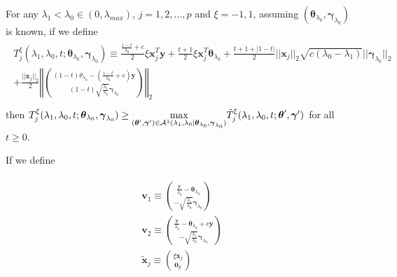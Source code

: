 \begin{theorem}
    \label{thm:2.1}
    For any $\lambda_1<\lambda_{0}\in (0,\lambda_{max})$, $j=1,2,...,p$ and $\xi=-1,1$, assuming $(\boldsymbol\theta_{\lambda_0},\boldsymbol\gamma_{\lambda_0})$ is known, if we define
    \begin{gather}
        \begin{aligned}
            T^\xi_j(\lambda_1,\lambda_0,t;\boldsymbol\theta_{\lambda_0},\boldsymbol\gamma_{\lambda_0})\equiv\frac{\frac{1-t}{\lambda_0}+c}{2}\xi\boldsymbol x_j^T \boldsymbol y+\frac{t+1}{2}\xi \boldsymbol x_j^T \boldsymbol \theta_{\lambda_0}+\frac{t+1+|1-t|}{2}||\boldsymbol x_j||_2\sqrt{c(\lambda_0-\lambda_1)}||\boldsymbol\gamma_{\lambda_0}||_2\\+\frac{||\boldsymbol x_j||_2}{2}\left\Vert\binom{(1-t)\theta_{\lambda_0}-\left(\frac{1-t}{\lambda_0}+c\right)\boldsymbol y}{(1-t)\sqrt{\frac{\lambda_1}{\lambda_0}}\boldsymbol\gamma_{\lambda_0}}\right\Vert_2\\
        \end{aligned}
    \end{gather}
    then $T^\xi_j(\lambda_1,\lambda_0,t;\boldsymbol\theta_{\lambda_0},\boldsymbol\gamma_{\lambda_0})\geq\underset{(\boldsymbol\theta',\boldsymbol\gamma')\in\mathcal{A}^1(\lambda_1,\lambda_0|\boldsymbol\theta_{\lambda_0},\boldsymbol\gamma_{\lambda_0})}{\mathrm{max}}\Tilde{T}^\xi_j(\lambda_1,\lambda_0,t;\boldsymbol\theta',\boldsymbol\gamma')$ for all $t\geq0$.
\end{theorem}

If we define

\begin{gather}
    \begin{aligned}
        \boldsymbol v_1\equiv\binom{\frac{\boldsymbol y}{\lambda_0}-\boldsymbol\theta_{\lambda_0}}{-\sqrt{\frac{\lambda_1}{\lambda_0}}\boldsymbol\gamma_{\lambda_0}}\\
        \boldsymbol v_2\equiv\binom{\frac{\boldsymbol y}{\lambda_0}-\boldsymbol\theta_{\lambda_0}+c\boldsymbol y}{-\sqrt{\frac{\lambda_1}{\lambda_0}}\boldsymbol\gamma_{\lambda_0}}\\
        \tilde{\boldsymbol x}_j\equiv\binom{\xi\boldsymbol x_j}{\boldsymbol 0_p}
    \end{aligned}
\end{gather}

